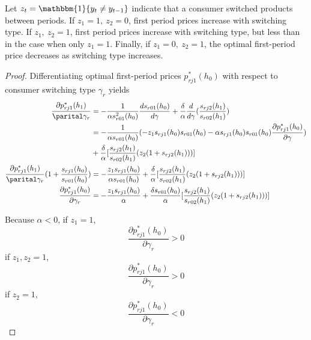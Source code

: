 \begin{proposition}
\label{prop:two}
  Let $z_t = \mathbbm{1}\{y_t\ne y_{t-1}\}$ indicate that a consumer switched
  products between periods. If $z_1 = 1, \ z_2=0$, first period prices increase
  with switching type. If $z_1, \ z_2 = 1$, first period prices increase with
  switching type, but less than in the case when only $z_1=1$. Finally, if $z_1=0, \ z_2=1$, the optimal first-period price decreases as switching type increases.
\end{proposition}

\begin{proof}
  Differentiating optimal first-period prices $p_{rj1}^*(h_0)$ with respect to
  consumer switching type $\gamma_r$ yields
  \begin{align*}
    \frac{\partial p_{rj1}^*(h_1)}{\parital\gamma_r} &= -\frac{1}{\alpha
    s_{r01}^2(h_0)}\frac{ds_{r01}(h_0)}{d\gamma} +
    \frac{\delta}{\alpha}\frac{d}{d\gamma}(\frac{s_{rj2}(h_1)}{s_{r02}(h_1)}) \\
    &= -\frac{1}{\alpha s_{r01}(h_0)}(-z_1s_{rj1}(h_0)s_{r01}(h_0) - \alpha
    s_{rj1}(h_0)s_{r01}(h_0)\frac{\partial p_{rj1}^*(h_0)}{\partial\gamma})  \\
    &+
    \frac{\delta}{\alpha}[\frac{s_{rj2}(h_1)}{s_{r02}(h_1)}(z_2(1+s_{rj2}(h_1)))] \\
    \frac{\partial p_{rj1}^*(h_1)}{\parital\gamma_r}(1+\frac{s_{rj1}(h_0)}{s_{r01}(h_0)}) &=
    -\frac{z_1s_{rj1}(h_0)}{\alpha s_{r01}(h_0)} +
    \frac{\delta}{\alpha}[\frac{s_{rj2}(h_1)}{s_{r02}(h_1)}(z_2(1+s_{rj2}(h_1)))] \\ 
    \frac{\partial
    p_{rj1}^*(h_0)}{\partial\gamma_r}&=-\frac{z_1s_{rj1}(h_0)}{\alpha} +
    \frac{\delta
    s_{r01}(h_0)}{\alpha}[\frac{s_{rj2}(h_1)}{s_{r02}(h_1)}(z_2(1+s_{rj2}(h_1)))]
  \end{align*}
  
  Because $\alpha < 0$, if $z_1=1$,
  \begin{equation}
    \frac{\partial p_{rj1}^*(h_0)}{\partial\gamma_r} > 0
  \end{equation}
  if $z_1, z_2=1$,
  \begin{equation}
    \frac{\partial p_{rj1}^*(h_0)}{\partial\gamma_r} > 0 
  \end{equation}
  if $z_2=1$,
  \begin{equation}
    \frac{\partial p_{rj1}^*(h_0)}{\partial\gamma_r} < 0 
  \end{equation}

\end{proof}

